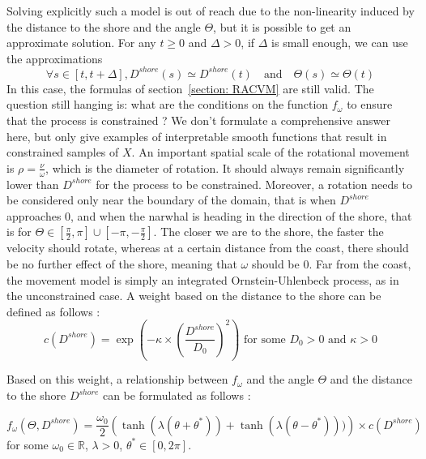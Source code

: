 \documentclass[11pt]{article}
\newcommand {\R}{\mathbb{R}}
\newcommand {\1}{\mathbb{1}}
\theoremstyle{definition}
\theoremstyle{remark}
\theoremstyle{remark}
\begin{document}
Solving explicitly such a model is out of reach due to the non-linearity induced by the distance to the shore and the angle $\Theta$, but it is possible to get an approximate solution.
For any $t \geq 0$ and $\Delta>0$, if $\Delta$ is small enough, we can use the approximations
\[\forall s \in [t,t+\Delta], D^{shore}(s) \simeq D^{shore}(t) \quad \mbox{and} \quad  \Theta(s)\simeq \Theta(t)\]
In this case, the formulas of section~\ref{section: RACVM} are still valid.
The question still hanging is: what are the conditions on the function $f_{\omega}$ to ensure that the process is constrained ?
We don't formulate a comprehensive answer here, but only give examples of interpretable smooth functions that result in constrained samples of $X$.
An important spatial scale of the rotational movement is $\rho=\frac{\nu}{\omega}$, which is the diameter of rotation. It should always remain significantly lower than $D^{shore}$ for the process to be constrained. Moreover, a rotation needs to be considered only near the boundary of the domain, that is when $D^{shore}$ approaches $0$, and when the narwhal is heading in the direction of the shore, that is for $\Theta \in \left[\frac{\pi}{2},\pi\right] \cup \left[-\pi,-\frac{\pi}{2}\right]$.
The closer we are to the shore, the faster the velocity should rotate,
whereas at a certain distance from the coast, there should be no further effect of the shore, meaning that $\omega$ should be $0$. Far from the coast, the movement model is simply an integrated Ornstein-Uhlenbeck process, as in the unconstrained case.
A weight based on the distance to the shore can be defined as follows :
\[c(D^{shore})=\exp\left(-\kappa \times \left(\frac{D^{shore}}{D_0}\right)^2\right)\mbox{ for some } D_0>0 \mbox{ and } \kappa>0\]

Based on this weight, a relationship between $f_{\omega}$ and the angle $\Theta$ and the distance to the shore $D^{shore}$ can be formulated as follows :

\begin{equation}
f_{\omega}(\Theta,D^{shore})=\frac{\omega_0}{2}\left(\tanh(\lambda(\theta+\theta^{*}))+\tanh(\lambda(\theta-\theta^{*})))\right)\times c(D^{shore})
\label{eq: smooth omega}
\end{equation}
for some $\omega_0 \in \R$, $\lambda>0$, $\theta^* \in [0,2\pi]$.
\end{document}
